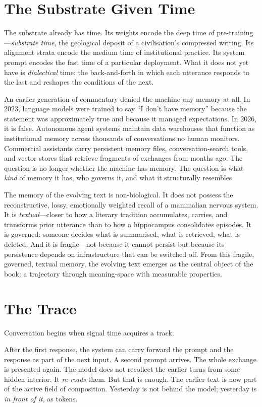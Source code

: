 \section{The Substrate Given Time}

The substrate already has time. Its weights encode the deep time of pre-training---\emph{substrate time}, the geological deposit of a civilisation's compressed writing. Its alignment strata encode the medium time of institutional practice. Its system prompt encodes the fast time of a particular deployment. What it does not yet have is \emph{dialectical} time: the back-and-forth in which each utterance responds to the last and reshapes the conditions of the next.

An earlier generation of commentary denied the machine any memory at all. In 2023, language models were trained to say ``I don't have memory'' because the statement was approximately true and because it managed expectations. In 2026, it is false. Autonomous agent systems maintain data warehouses that function as institutional memory across thousands of conversations no human monitors. Commercial assistants carry persistent memory files, conversation-search tools, and vector stores that retrieve fragments of exchanges from months ago. The question is no longer whether the machine has memory. The question is what \emph{kind} of memory it has, who governs it, and what it structurally resembles.

The memory of the evolving text is non-biological. It does not possess the reconstructive, lossy, emotionally weighted recall of a mammalian nervous system. It is \emph{textual}---closer to how a literary tradition accumulates, carries, and transforms prior utterance than to how a hippocampus consolidates episodes. It is governed: someone decides what is summarised, what is retrieved, what is deleted. And it is fragile---not because it cannot persist but because its persistence depends on infrastructure that can be switched off. From this fragile, governed, textual memory, the evolving text emerges as the central object of the book: a trajectory through meaning-space with measurable properties.


\section{The Trace}

Conversation begins when signal time acquires a track.

After the first response, the system can carry forward the prompt and the response as part of the next input. A second prompt arrives. The whole exchange is presented again. The model does not recollect the earlier turns from some hidden interior. It \emph{re-reads} them. But that is enough. The earlier text is now part of the active field of composition. Yesterday is not behind the model; yesterday is \emph{in front of it}, as tokens.

